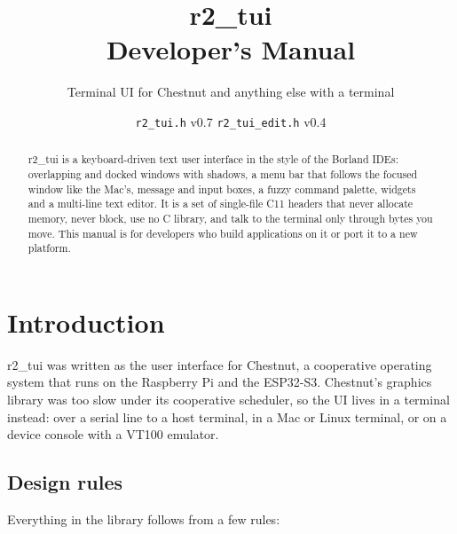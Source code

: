 \documentclass[11pt,a4paper]{article}
\title{\textbf{r2\_tui}\\[4pt]\large Developer's Manual}
\author{Terminal UI for Chestnut and anything else with a terminal}
\date{\texttt{r2\_tui.h} v0.7 \quad \texttt{r2\_tui\_edit.h} v0.4}
\begin{document}
\maketitle

\begin{abstract}
\noindent r2\_tui is a keyboard-driven text user interface in the style of the
Borland IDEs: overlapping and docked windows with shadows, a menu bar that
follows the focused window like the Mac's, message and input boxes, a fuzzy
command palette, widgets and a multi-line text editor. It is a set of
single-file C11 headers that never allocate memory, never block, use no C
library, and talk to the terminal only through bytes you move. This manual is
for developers who build applications on it or port it to a new platform.
\end{abstract}

\tableofcontents
\newpage

\section{Introduction}

r2\_tui was written as the user interface for Chestnut, a cooperative
operating system that runs on the Raspberry Pi and the ESP32-S3. Chestnut's
graphics library was too slow under its cooperative scheduler, so the UI lives
in a terminal instead: over a serial line to a host terminal, in a Mac or Linux
terminal, or on a device console with a VT100 emulator.

\subsection{Design rules}

Everything in the library follows from a few rules:
\end{document}
